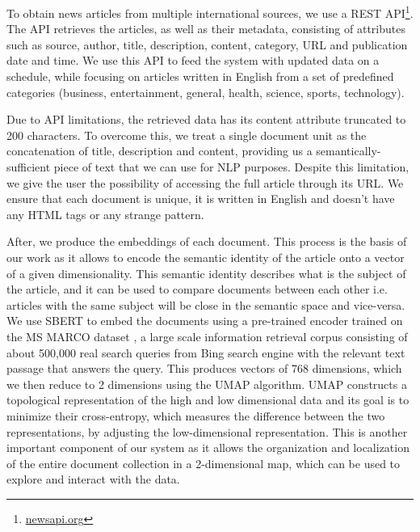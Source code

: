 \documentclass[a4paper]{article}
\begin{document}
To obtain news articles from multiple international sources, we use a REST API\footnote{\href{https://newsapi.org/}{newsapi.org}}. The API retrieves the articles, as well as their metadata, consisting of attributes such as source, author, title, description, content, category, URL and publication date and time. We use this API to feed the system with updated data on a schedule, while focusing on articles written in English from a set of predefined categories (business, entertainment, general, health, science, sports, technology).

Due to API limitations, the retrieved data has its content attribute truncated to 200 characters. To overcome this, we treat a single document unit as the concatenation of title, description and content, providing us a semantically-sufficient piece of text that we can use for NLP purposes. Despite this limitation, we give the user the possibility of accessing the full article through its URL. We ensure that each document is unique, it is written in English and doesn't have any HTML tags or any strange pattern.

After, we produce the embeddings of each document. This process is the basis of our work as it allows to encode the semantic identity of the article onto a vector of a given dimensionality. This semantic identity describes what is the subject of the article, and it can be used to compare documents between each other i.e. articles with the same subject will be close in the semantic space and vice-versa. We use SBERT \citep{reimers2019} to embed the documents using a pre-trained encoder trained on the MS MARCO dataset \citep{bajaj2018}, a large scale information retrieval corpus consisting of about 500,000 real search queries from Bing search engine with the relevant text passage that answers the query. This produces vectors of 768 dimensions, which we then reduce to 2 dimensions using the UMAP \citep{mcinnes2020} algorithm. UMAP constructs a topological representation of the high and low dimensional data and its goal is to minimize their cross-entropy, which measures the difference between the two representations, by adjusting the low-dimensional representation. This is another important component of our system as it allows the organization and localization of the entire document collection in a 2-dimensional map, which can be used to explore and interact with the data.

\end{document}
